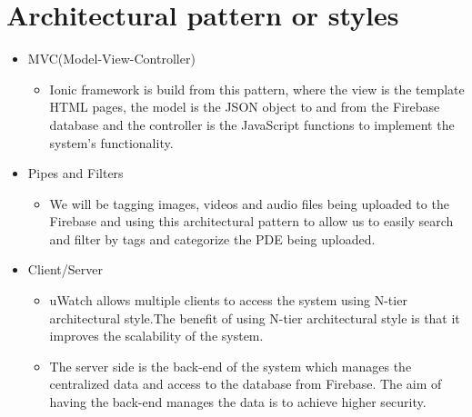 \documentclass[a4paper,12pt]{article}
\begin{document}
\section{Architectural pattern or styles}
	\begin{itemize}
		\item MVC(Model-View-Controller)
			\begin{itemize}
				\item Ionic framework is build from this pattern, where the view is the template HTML pages, the model is the JSON object to and from the Firebase database and the controller is the JavaScript functions to implement the system's functionality.
			\end{itemize}
		\item Pipes and Filters
		\begin{itemize}
		\item We will be tagging images, videos and audio files being uploaded to the Firebase and using this architectural pattern to allow us to easily search and filter by tags and categorize the PDE being uploaded.
		\end{itemize}
		\item Client/Server 
			\begin{itemize}
				\item uWatch allows multiple clients to access the system using N-tier
				architectural style.The benefit of using N-tier architectural style is that
				it improves the scalability of the system.
				\item The server side is the back-end of the system which manages the centralized data and access to the database from Firebase. The aim of
having the back-end manages the data is to achieve higher security. 
			\end{itemize}
	\end{itemize}
\end{document}
